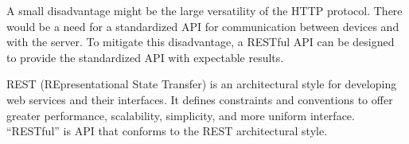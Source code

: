 A small disadvantage might be the large versatility of the HTTP protocol. There would be
a need for a standardized API for communication between devices and with the
server. To mitigate this disadvantage, a RESTful API can be designed to provide
the standardized API with expectable results.


REST (REpresentational State Transfer) is an architectural style for developing
web services and their interfaces. It defines constraints and conventions to
offer greater performance, scalability, simplicity, and more uniform interface.
\cite{restdef} ``RESTful'' is API that conforms to the REST architectural style.